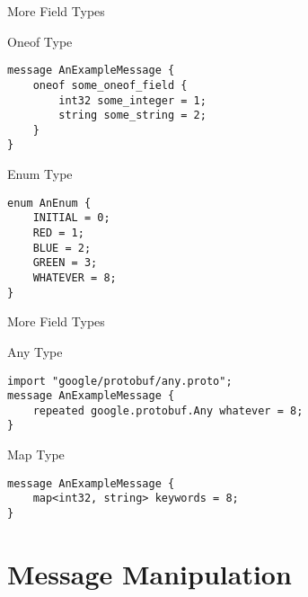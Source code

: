\begin{frame}[fragile]{More Field Types}
    \begin{block}{Oneof Type}
\begin{lstlisting}[style=mini]
message AnExampleMessage {
    oneof some_oneof_field {
        int32 some_integer = 1;
        string some_string = 2;
    }
}
\end{lstlisting}
    \end{block}
    \begin{block}{Enum Type}
\begin{lstlisting}[style=mini]
enum AnEnum {
    INITIAL = 0;
    RED = 1;
    BLUE = 2;
    GREEN = 3;
    WHATEVER = 8;
}
\end{lstlisting}
    \end{block}
\end{frame}


\begin{frame}[fragile]{More Field Types}
    \begin{block}{Any Type}
\begin{lstlisting}[style=mini]
import "google/protobuf/any.proto";
message AnExampleMessage {
    repeated google.protobuf.Any whatever = 8;
}
\end{lstlisting}
    \end{block}

    \bigskip

    \begin{block}{Map Type}
\begin{lstlisting}[style=mini]
message AnExampleMessage {
    map<int32, string> keywords = 8;
}
\end{lstlisting}
    \end{block}
\end{frame}


\section{Message Manipulation}



